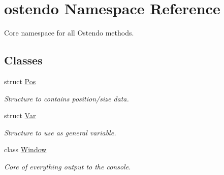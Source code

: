 \hypertarget{namespaceostendo}{}\section{ostendo Namespace Reference}
\label{namespaceostendo}


Core namespace for all Ostendo methods.  


\subsection*{Classes}
\begin{DoxyCompactItemize}
\item 
struct \hyperlink{structostendo_1_1Pos}{Pos}
\begin{DoxyCompactList}\small\item\em Structure to contains position/size data. \end{DoxyCompactList}\item 
struct \hyperlink{structostendo_1_1Var}{Var}
\begin{DoxyCompactList}\small\item\em Structure to use as general variable. \end{DoxyCompactList}\item 
class \hyperlink{classostendo_1_1Window}{Window}
\begin{DoxyCompactList}\small\item\em Core of everything output to the console. \end{DoxyCompactList}\end{DoxyCompactItemize}
